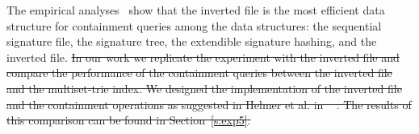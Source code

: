 \documentclass[10pt,letterpaper]{article}
\providecommand{\DIFdeltex}[1]{{\protect\color{red}\sout{#1}}}                      %
\providecommand{\DIFdelbegin}{} %
\providecommand{\DIFdelend}{} %
\providecommand{\DIFdel}[1]{\texorpdfstring{\DIFdeltex{#1}}{}} %
\newcommand{\DIFscaledelfig}{0.5}
\newlength{\DIFdelgraphicswidth} %
\newlength{\DIFdelgraphicsheight} %
\newcommand{\DIFdelincludegraphics}[2][]{%
\sbox{\DIFdelgraphicsbox}{\DIFOincludegraphics[#1]{#2}}%
\settoboxwidth{\DIFdelgraphicswidth}{\DIFdelgraphicsbox} %
\settoboxtotalheight{\DIFdelgraphicsheight}{\DIFdelgraphicsbox} %
\scalebox{\DIFscaledelfig}{%
\parbox[b]{\DIFdelgraphicswidth}{\usebox{\DIFdelgraphicsbox}\\[-\baselineskip] \rule{\DIFdelgraphicswidth}{0em}}\llap{\resizebox{\DIFdelgraphicswidth}{\DIFdelgraphicsheight}{%
\setlength{\unitlength}{\DIFdelgraphicswidth}%
\begin{picture}(1,1)%
\thicklines\linethickness{2pt} %
{\color[rgb]{1,0,0}\put(0,0){\framebox(1,1){}}}%
{\color[rgb]{1,0,0}\put(0,0){\line( 1,1){1}}}%
{\color[rgb]{1,0,0}\put(0,1){\line(1,-1){1}}}%
\end{picture}%
}\hspace*{3pt}}} %
} %
\DeclareRobustCommand{\DIFdelbegin}{\DIFOdelbegin \let\includegraphics\DIFdelincludegraphics} %
\DeclareRobustCommand{\DIFdelend}{\DIFOaddend \let\includegraphics\DIFOincludegraphics} %
\begin{document}
The empirical analyses~\cite{Helmer2003,zobel1998inverted} show that the inverted file is the most efficient data structure for containment queries among the data structures: the sequential signature file, the signature tree, the extendible signature hashing, and the inverted file. 
\DIFdelbegin \DIFdel{In our work we replicate the experiment with the inverted file and compare the performance of the containment queries between the inverted file and the multiset-trie index. We designed the implementation of the inverted file and the containment operations as suggested in Helmer et al. in \mbox{%
\cite{Helmer2003}}\hspace{0pt}%
. The results of this comparison can be found in Section~\ref{s:exp5}.
}\DIFdelend 

\end{document}

